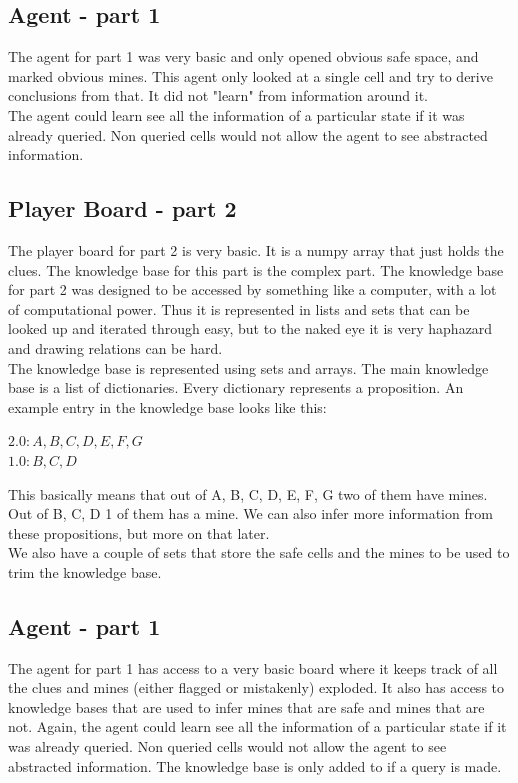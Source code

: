 \documentclass[11pt]{scrartcl} %
\newcommand{\comment}[1]{}
\begin{document}
\subsection{Agent - part 1}
The agent for part 1 was very basic and only opened obvious safe space, and marked obvious mines. This agent only looked at a single cell and try to derive conclusions from that. It did not "learn" from information around it.\\
The agent could learn see all the information of a particular state if it was already queried. Non queried cells would not allow the agent to see abstracted information.  
\comment{
It followed the following algorithm (given by Prof Cowan)

}

\subsection{Player Board - part 2}
The player board for part 2 is very basic. It is a numpy array that just holds the clues. The knowledge base for this part is the complex part. The knowledge base for part 2 was designed to be accessed by something like a computer, with a lot of computational power. Thus it is represented in lists and sets that can be looked up and iterated through easy, but to the naked eye it is very haphazard and drawing relations can be hard. \\
The knowledge base is represented using sets and arrays. The main knowledge base is a list of dictionaries. Every dictionary represents a proposition. An example entry in the knowledge base looks like this:
\begin{center}
$2.0:{A, B, C, D, E, F, G}$\\
$1.0:{B, C, D}$ 
\end{center}
This basically means that out of A, B, C, D, E, F, G two of them have mines. Out of B, C, D 1 of them has a mine. We can also infer more information from these propositions, but more on that later. \\
We also have a couple of sets that store the safe cells and the mines to be used to trim the knowledge base. 

\subsection{Agent - part 1}
The agent for part 1 has access to a very basic board where it keeps track of all the clues and mines (either flagged or mistakenly) exploded. It also has access to knowledge bases that are used to infer mines that are safe and mines that are not. Again, the agent could learn see all the information of a particular state if it was already queried. Non queried cells would not allow the agent to see abstracted information. The knowledge base is only added to if a query is made. 
\end{document}
